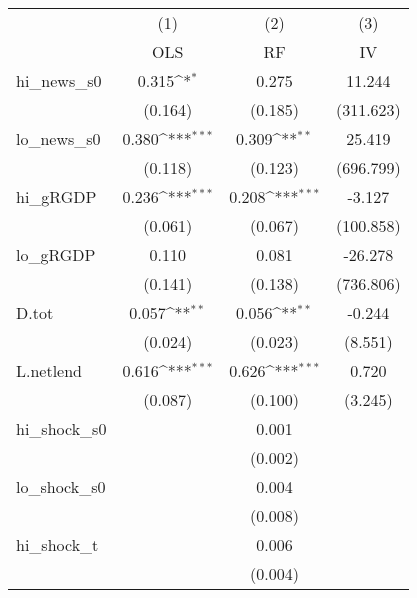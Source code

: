 {
\def\sym#1{\ifmmode^{#1}\else\(^{#1}\)\fi}
\begin{tabular}{l*{3}{c}}
\toprule
            &\multicolumn{1}{c}{(1)}&\multicolumn{1}{c}{(2)}&\multicolumn{1}{c}{(3)}\\
            &\multicolumn{1}{c}{OLS}&\multicolumn{1}{c}{RF}&\multicolumn{1}{c}{IV}\\
\midrule
hi\_news\_s0  &       0.315\sym{*}  &       0.275         &      11.244         \\
            &     (0.164)         &     (0.185)         &   (311.623)         \\
\addlinespace
lo\_news\_s0  &       0.380\sym{***}&       0.309\sym{**} &      25.419         \\
            &     (0.118)         &     (0.123)         &   (696.799)         \\
\addlinespace
hi\_gRGDP    &       0.236\sym{***}&       0.208\sym{***}&      -3.127         \\
            &     (0.061)         &     (0.067)         &   (100.858)         \\
\addlinespace
lo\_gRGDP    &       0.110         &       0.081         &     -26.278         \\
            &     (0.141)         &     (0.138)         &   (736.806)         \\
\addlinespace
D.tot       &       0.057\sym{**} &       0.056\sym{**} &      -0.244         \\
            &     (0.024)         &     (0.023)         &     (8.551)         \\
\addlinespace
L.netlend   &       0.616\sym{***}&       0.626\sym{***}&       0.720         \\
            &     (0.087)         &     (0.100)         &     (3.245)         \\
\addlinespace
hi\_shock\_s0 &                     &       0.001         &                     \\
            &                     &     (0.002)         &                     \\
\addlinespace
lo\_shock\_s0 &                     &       0.004         &                     \\
            &                     &     (0.008)         &                     \\
\addlinespace
hi\_shock\_t  &                     &       0.006         &                     \\
            &                     &     (0.004)         &                     \\

\end{tabular}}
